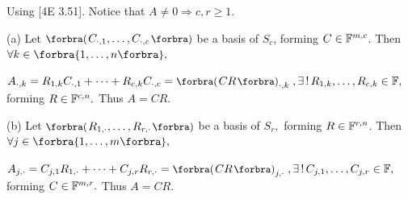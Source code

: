Using [4E 3.51]. Notice that $A\neq 0\Rightarrow c,r\geqslant 1.$\vspace{2pt}\par\quad
(a) Let $\BigPar{C_{\cdot,1},\dots,C_{\cdot,c}}$ be a basis of $S_c$, forming $C\in{\mathbb{F}}^{m,c}$. Then $\forall k\in\Bra{1,\dots,n},$\vspace{2pt}\par\quad\Ha
$A_{\cdot,k}=R_{1,k}C_{\cdot,1}+\dots+R_{c,k}C_{\cdot,c}=\BigPar{CR}_{\cdot,k}\;,\exists\,!\,R_{1,k},\dots,R_{c,k}\in\Fbb,$ forming $R\in{\mathbb{F}}^{c,n}.$ Thus $A=CR.$\vspace{4pt}\par\quad
(b) Let $\BigPar{R_{1,\cdot},\dots,R_{r,\cdot}}$ be a basis of $S_r,$ forming $R\in{\mathbb{F}}^{r,n}$. Then $\forall j\in\Bra{1,\dots,m},$\vspace{2pt}\par\quad\Hb
$A_{j,\cdot}=C_{j,1}R_{1,\cdot}+\dots+C_{j,r}R_{r,\cdot}=\BigPar{CR}_{j,\cdot}\;,\exists\,!\,C_{j,1},\dots,C_{j,r}\in\Fbb,$ forming $C\in{\mathbb{F}}^{m,r}.$ Thus $A=CR.$\PfEnd\vspace{4pt}
\Example\par\quad\hspace{0pt}
